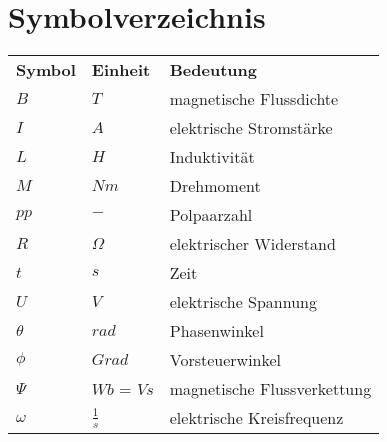 \section*{Symbolverzeichnis}

\begin{table}[h]
    \begin{spacing}{1.3}
        \begin{large}
            \begin{tabular}{p{2cm} p{3cm} l}
                \textbf{Symbol} & \textbf{Einheit} & \textbf{Bedeutung}\\
                $B$ & $T$ & magnetische Flussdichte \\
                $I$ & $A$ & elektrische Stromstärke \\
                $L$ & $H$ & Induktivität \\
                $M$ & $Nm$ & Drehmoment \\
                $pp$ & $-$ & Polpaarzahl \\
                $R$ & $\Omega$ & elektrischer Widerstand \\
                $t$ & $s$ & Zeit \\
                $U$ & $V$ & elektrische Spannung \\
                $\theta$ & $rad$ & Phasenwinkel \\
                $\phi$ & $Grad$ & Vorsteuerwinkel \\
                $\Psi$ & $Wb$ = $Vs$ & magnetische Flussverkettung \\
                $\omega$ & $\frac{1}{s}$ & elektrische Kreisfrequenz \\
            \end{tabular}
        \end{large}
    \end{spacing}

\end{table}